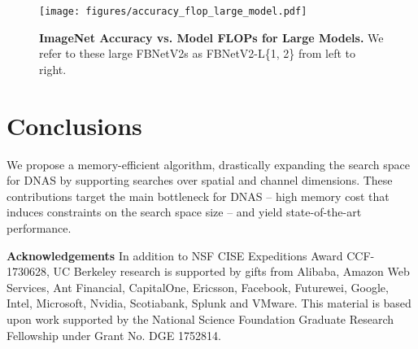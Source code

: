 \documentclass[10pt,twocolumn,letterpaper]{article}
\begin{document}
\begin{figure}
    \centering
    \texttt{[image: figures/accuracy\_flop\_large\_model.pdf]}
    \caption{\textbf{ImageNet Accuracy vs. Model FLOPs for Large Models.} We refer to these large FBNetV2s as FBNetV2-L\{1, 2\} from left to right.}
    \label{fig:results-large}
\end{figure}






\section{Conclusions}
We propose a memory-efficient algorithm, drastically expanding the search space for DNAS by supporting searches over spatial and channel dimensions. These contributions target the main bottleneck for DNAS -- high memory cost that induces constraints on the search space size -- and yield state-of-the-art performance.

\textbf{Acknowledgements} In addition to NSF CISE Expeditions Award CCF-1730628, UC Berkeley research is supported by gifts from Alibaba, Amazon Web Services, Ant Financial, CapitalOne, Ericsson, Facebook, Futurewei, Google, Intel, Microsoft, Nvidia, Scotiabank, Splunk and VMware. This material is based upon work supported by the National Science Foundation Graduate Research Fellowship under Grant No. DGE 1752814.


{\small


}
\end{document}
